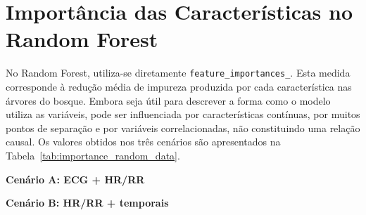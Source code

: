 \section{Importância das Características no Random Forest}

No Random Forest, utiliza-se diretamente \texttt{feature\_importances\_}. Esta medida corresponde à redução média de impureza produzida por cada característica nas árvores do bosque. Embora seja útil para descrever a forma como o modelo utiliza as variáveis, pode ser influenciada por características contínuas, por muitos pontos de separação e por variáveis correlacionadas, não constituindo uma relação causal. Os valores obtidos nos três cenários são apresentados na Tabela~\ref{tab:importance_random_data}.

\begin{table}[H]
\centering
\scriptsize
\begin{minipage}{0.32\textwidth}\centering
\textbf{Cenário A: ECG + HR/RR}
\end{minipage}\hfill
\begin{minipage}{0.32\textwidth}\centering
\textbf{Cenário B: HR/RR + temporais}

\end{minipage}
\end{table}
